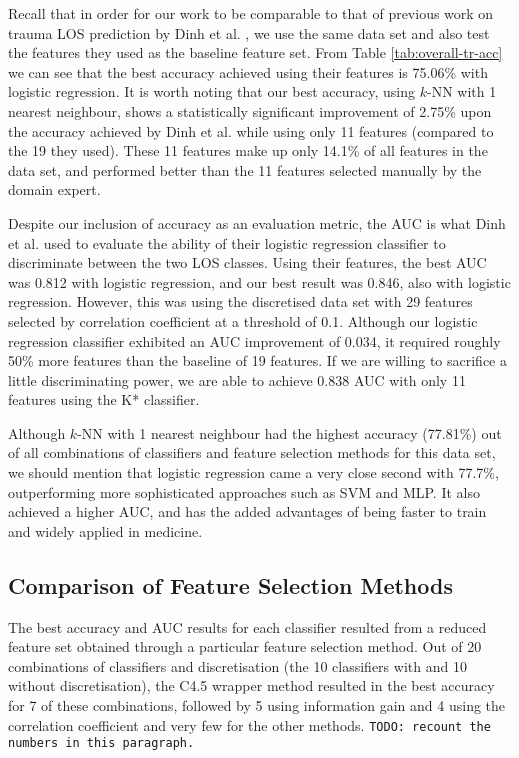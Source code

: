 \documentclass{article}
\begin{document}
Recall that in order for our work to be comparable to that of previous work on
trauma LOS prediction by Dinh et al. \cite{Dinh2013a}, we use the same data
set and also test the features they used as the baseline feature set.
From Table \ref{tab:overall-tr-acc} we can see that
the best accuracy achieved using their features is 75.06\% with logistic
regression.
It is worth noting that our best accuracy, using $k$-NN with 1
nearest neighbour, shows a statistically significant improvement of 2.75\% upon
the accuracy achieved by Dinh et al.
while using only 11 features (compared to the 19 they used). These 11 features
make up only 14.1\% of all features in the data set, and performed better than
the 11 features selected manually by the domain expert.

Despite our inclusion of accuracy as an evaluation metric, the AUC is what Dinh
et al. \cite{Dinh2013a}
used to evaluate the ability of their logistic regression classifier to
discriminate between the two LOS classes. Using their features, the best AUC
was 0.812 with logistic regression, and our best result was 0.846, also with
logistic regression. However, this was using the discretised data set with 29
features selected by correlation coefficient at a threshold of 0.1.
Although our logistic regression classifier exhibited an AUC improvement of
0.034, it required roughly 50\% more features than the baseline of 19 features.
If we are willing to sacrifice a little discriminating power, we are able to
achieve 0.838 AUC with only 11 features using the K* classifier.

Although $k$-NN with 1 nearest neighbour had the highest accuracy (77.81\%) out
of all combinations of classifiers and feature selection methods for this data
set, we should mention that logistic regression came a very close second with
77.7\%, outperforming more sophisticated approaches such as SVM and MLP. It
also achieved a higher AUC, and has the added advantages of being faster to
train and widely applied in medicine.

\subsection{Comparison of Feature Selection Methods}
The best accuracy and AUC results for
each classifier resulted from a reduced feature set obtained through a
particular feature selection method. Out of 20 combinations of classifiers
and discretisation (the 10 classifiers with and 10 without
discretisation), the C4.5 wrapper method resulted in the best
accuracy for 7 of these combinations, followed by 5 using information gain
and 4 using the correlation coefficient and very few for the other methods.
\texttt{TODO: recount the numbers in this paragraph.}
\end{document}
